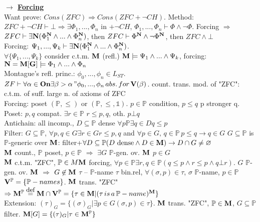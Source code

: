 \documentclass[9pt]{article}
\newcommand{\class}[1]{{\bf #1}}
\newcommand{\Pp}{\mathbb{P}}
\newcommand{\eqdef}{\overset{\mbox{\small{def}}}{=}}
\newcommand{\mytitle}[1]{ {\bf $\rightarrow$ \underline{#1}}\\}
\newcommand{\On}{\class{On}}
\newcommand{\V}{\class{V}}
\begin{document}
\begin{multicols*}{2}
\mytitle{Forcing}
Want prove: $Cons(ZFC)\Rightarrow Cons(ZFC+\neg CH)$.
Method: $ZFC+\neg CH\vdash\bot\Rightarrow\exists \Phi_1,...,\Phi_n$ in $+\neg CH$, $\Phi_1,...,\Phi_n\vdash \Phi \wedge\neg\Phi$.
Forcing $\Rightarrow$ $ZFC\vdash\exists\class{N}(\Phi_1^\class{N}\wedge...\wedge\Phi_n^\class{N})$, then $ZFC\vdash \Phi^\class{N}\wedge\neg\Phi^\class{N}$, then $ZFC\wedge\bot$\\
Forcing: $\Psi_1,...,\Psi_k\vdash \exists\class{N}(\Phi_1^\class{N}\wedge...\wedge\Phi_n^\class{N})$.\\
$\forall \{\Psi_1,...,\Psi_k\}$ consider c.t.m. $\class{M}$ (refl.) $\class{M}\models \Psi_1\wedge...\wedge\Psi_k$, forcing: $\class{N}=\class{M}[\class{G}]\models\Phi_1\wedge...\wedge\Phi_n$\\

Montague's refl. princ.: $\phi_0,...,\phi_n\in L_{ST}$. $ZF\vdash \forall\alpha\in\On\exists\beta>\alpha \,"\phi_0,...,\phi_n\,abs.\,for\,\V(\beta)$. count. trans. mod. of "ZFC": c.t.m. of suff. large n. of axioms of ZFC\\
Forcing: poset $(\mathbb{P}, \leqslant)$ or $(\mathbb{P}, \leqslant,\mathbb{1})$. $p\in \Pp$ condition, $p\leqslant q$ p stronger q.\\
Poset: $p,q$ compat. $\exists r\in \Pp$ $r\leqslant p, q$, oth. $p\bot q$\\
Antichain: all incomp., $D\subseteq \Pp$ dense $\forall p\Pp\exists q\in D q\leqslant p$\\
Filter: $G\subseteq \Pp$, $\forall p, q\in G\exists r\in G r\leqslant p, q$ and $\forall p\in G,\,q\in \Pp\,p\leqslant q\rightarrow q\in G$
$G\subseteq \Pp$ is $\Pp$-generic over $\class{M}$: filter+$\forall D\subseteq \Pp (D\mbox{ dense}\wedge D\in\class{M})\rightarrow D\cap G\neq \varnothing$\\
$\class{M}$ count., $\Pp$ poset, $p\in \Pp$ $\Rightarrow$ $\exists G$ $\Pp$-gen. ov. $\class{M}$ $p\in G$\\
$\class{M}$ c.t.m. "ZFC", $\Pp\in M\class{M}$ forcing, $\forall p\in\Pp\exists r,q\in\Pp (q\leqslant p\wedge r\leqslant p\wedge q\bot r)$. $G$ $\Pp$-gen. ov. $\class{M}$ $\Rightarrow$ $G\not\in\class{M}$
$\tau$ -- $\Pp$-name $\tau$ bin.rel, $\forall (\sigma,p)\in\tau$, $\sigma$ $\Pp$-name, $p\in\Pp$\\
$\V^\Pp=\{\Pp-names\}$. $\class{M}$ trans. "ZFC" $\Rightarrow \class{M}^\Pp\eqdef \class{M}\cap\V^\Pp=\{\tau\in\class{M}|(\tau\,is\,a\,\Pp-name)^\class{M}\}$\\
Extension: $(\tau)_G=\{(\sigma)_G|\exists p\in G(\sigma,p)\in\tau\}$. $\class{M}$ trans. "ZFC", $\Pp\in\class{M}$, $G\subseteq \Pp$ filter. $\class{M}[G]=\{(\tau)_G|\tau\in\class{M}^\Pp\}$
\end{multicols*}
\end{document}
